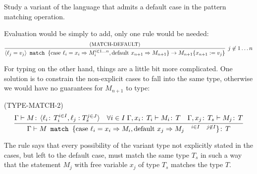 \subsection{}

Study a variant of the language that admits a default case in the
pattern matching operation.

Evaluation would be simply to add, only one rule would be needed:
\[
\infer[j\not\in1\dots n]
      {
        \MATCH{\VAR{\ell_j = v_j}}{\text{case } \ell_i = x_i \Rightarrow M_i ^{i\in 1 \dots n}, \text{default } x_{n+1} \Rightarrow M_{n+1}}
        \to
        M_{n+1}\SUBST{x_{n+1}}{v_j}
      }
      {\text{\small{(MATCH-DEFAULT)}}}
\]

For typing on the other hand, things are a little bit more
complicated. One solution is to constrain the non-explicit cases to
fall into the same type, otherwise we would have no guarantees for
\(M_{n+1}\) to type:

(TYPE-MATCH-2)
\[
\infer
    {\Gamma \vdash
      \MATCH{M}{\text{case } \ell_i = x_i \Rightarrow M_i,
        \text{default } x_j \Rightarrow M_j
        \quad ^{i\in I\quad j\not\in I}}\TYPE{T}}
    {
      \Gamma \vdash M \TYPE{\VAR{\ell_i \TYPE{T_i} ^{i\in I}, \ell_j : T_s ^{j\in J}}}
      &
      \forall i \in I \; \Gamma, x_i \TYPE{T_i} \vdash M_i \TYPE{T}
      &
      \Gamma, x_j \TYPE{T_s} \vdash M_j \TYPE{T}
    }
\]

The rule says that every possibility of the variant type not
explicitly stated in the cases, but left to the default case, must
match the same type \(T_s\) in such a way that the statement \(M_j\)
with free variable \(x_j\) of type \(T_s\) matches the type \(T\).
